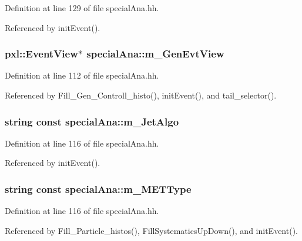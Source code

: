 Definition at line 129 of file special\-Ana.\-hh.



Referenced by init\-Event().

\subsubsection[{m\-\_\-\-Gen\-Evt\-View}]{\setlength{\rightskip}{0pt plus 5cm}pxl\-::\-Event\-View$\ast$ special\-Ana\-::m\-\_\-\-Gen\-Evt\-View}\label{classspecialAna_a68771d0c3f87434532645d27d5c2316b}


Definition at line 112 of file special\-Ana.\-hh.



Referenced by Fill\-\_\-\-Gen\-\_\-\-Controll\-\_\-histo(), init\-Event(), and tail\-\_\-selector().

\subsubsection[{m\-\_\-\-Jet\-Algo}]{\setlength{\rightskip}{0pt plus 5cm}string const special\-Ana\-::m\-\_\-\-Jet\-Algo}\label{classspecialAna_a7ac446797f2e7984a748e887709870c3}


Definition at line 116 of file special\-Ana.\-hh.



Referenced by init\-Event().

\subsubsection[{m\-\_\-\-M\-E\-T\-Type}]{\setlength{\rightskip}{0pt plus 5cm}string const special\-Ana\-::m\-\_\-\-M\-E\-T\-Type}\label{classspecialAna_a3463aa545f96fc9a4ae14b82aadb01c6}


Definition at line 116 of file special\-Ana.\-hh.



Referenced by Fill\-\_\-\-Particle\-\_\-histos(), Fill\-Systematics\-Up\-Down(), and init\-Event().

